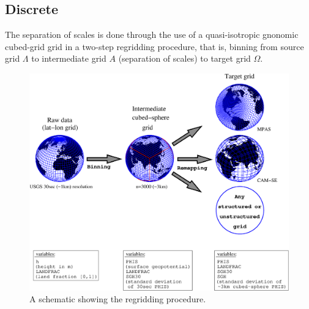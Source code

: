 \documentclass[gmd]{copernicus}
\begin{document}
{\color{red}{[julio: continuous definition of dominant orientation of orography with this notation?]}}
\subsection{Discrete}
The separation of scales is done through the use of a quasi-isotropic gnonomic cubed-grid grid in a two-step regridding procedure, that is, binning from source grid $\Lambda$ to intermediate grid $A$ (separation of scales) to target grid $\Omega$. 

\begin{figure}[t]
\vspace*{2mm}
\begin{center}
\includegraphics[width=12cm]{fig/spheres.eps}
\end{center}
  \caption{A schematic showing the regridding procedure.}\label{fig:schematic}
\end{figure}
\end{document}
